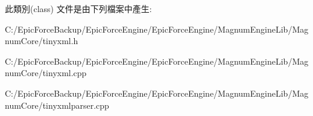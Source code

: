 此類別(class) 文件是由下列檔案中產生\+:\begin{DoxyCompactItemize}
\item 
C\+:/\+Epic\+Force\+Backup/\+Epic\+Force\+Engine/\+Epic\+Force\+Engine/\+Magnum\+Engine\+Lib/\+Magnum\+Core/tinyxml.\+h\item 
C\+:/\+Epic\+Force\+Backup/\+Epic\+Force\+Engine/\+Epic\+Force\+Engine/\+Magnum\+Engine\+Lib/\+Magnum\+Core/tinyxml.\+cpp\item 
C\+:/\+Epic\+Force\+Backup/\+Epic\+Force\+Engine/\+Epic\+Force\+Engine/\+Magnum\+Engine\+Lib/\+Magnum\+Core/tinyxmlparser.\+cpp\end{DoxyCompactItemize}
